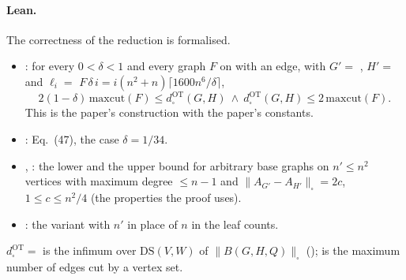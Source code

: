 \paragraph{Lean.} The correctness of the reduction is formalised.
\begin{itemize}
\item {}: for every $0<\delta<1$ and every graph $F$ on
   with an edge, with $G'=$ , $H'=$  and
  $\ell_i=$  $F\,\delta\,i=i(n^2+n)\lceil1600n^6/\delta\rceil$,
  \[ 2(1-\delta)\,\mathrm{maxcut}(F)\le d^{\mathrm{OT}}_\square(G,H)\ \wedge\ d^{\mathrm{OT}}_\square(G,H)\le2\,\mathrm{maxcut}(F). \]
  This is the paper's construction with the paper's constants.
\item {}: Eq.~(47), the case $\delta=1/34$.
\item {}, : the lower and the
  upper bound for arbitrary base graphs on $n'\le n^2$ vertices with maximum degree $\le n-1$ and
  $\|A_{G'}-A_{H'}\|_\square=2c$, $1\le c\le n^2/4$ (the properties the proof uses).
\item {}: the variant with $n'$ in place of $n$ in the leaf counts.
\end{itemize}
$d^{\mathrm{OT}}_\square=$  is the infimum over $\mathrm{DS}(V,W)$ of $\|B(G,H,Q)\|_\square$
();  is the maximum number of edges cut by a vertex set.

